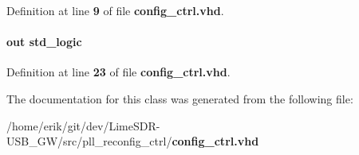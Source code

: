 Definition at line {\bf 9} of file {\bf config\+\_\+ctrl.\+vhd}.

\paragraph[{wr\+\_\+rom}]{ {\bfseries \textcolor{keywordflow}{out}\textcolor{vhdlchar}{ }} {\bfseries \textcolor{comment}{std\+\_\+logic}\textcolor{vhdlchar}{ }} \hspace{0.3cm}{\ttfamily [Port]}}\label{classconfig__ctrl_a0d092084e9b9ed6fdf6edceeece0dd0b}


Definition at line {\bf 23} of file {\bf config\+\_\+ctrl.\+vhd}.



The documentation for this class was generated from the following file\+:\begin{DoxyCompactItemize}
\item 
/home/erik/git/dev/\+Lime\+S\+D\+R-\/\+U\+S\+B\+\_\+\+G\+W/src/pll\+\_\+reconfig\+\_\+ctrl/{\bf config\+\_\+ctrl.\+vhd}\end{DoxyCompactItemize}
